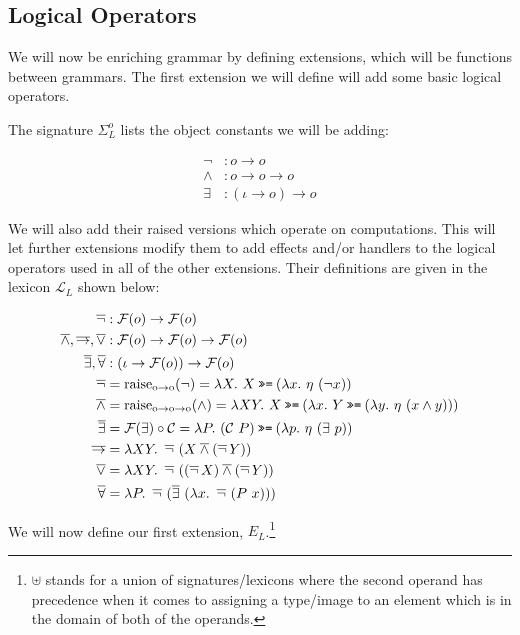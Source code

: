 \subsection{Logical Operators}

We will now be enriching grammar by defining extensions, which will be
functions between grammars. The first extension we will define will add
some basic logical operators.

The signature $\Sigma^o_L$ lists the object constants we will be
adding:

\begin{align*}
  \lnot &: o \to o \\
  \land &: o \to o \to o \\
  \exists &: (\iota \to o) \to o
\end{align*}

We will also add their raised versions which operate on computations. This
will let further extensions modify them to add effects and/or handlers to
the logical operators used in all of the other extensions. Their
definitions are given in the lexicon $\mathcal{L}_L$ shown below:

\begin{align*}
  \dnot &: \mathcal{F}(o) \to \mathcal{F}(o) \\
  \dand, \dimpl, \dor &: \mathcal{F}(o) \to \mathcal{F}(o) \to \mathcal{F}(o) \\
  \dexists, \dforall &: (\iota \to \mathcal{F}(o)) \to \mathcal{F}(o) \\
  \dnot &= \mathrm{raise_{o \to o}}(\lnot) = \lambda X.\ X \hsbind (\lambda x.\ \eta\ (\lnot x)) \\
  \dand &= \mathrm{raise_{o \to o \to o}}(\land) = \lambda X Y.\ X \hsbind (\lambda x.\ Y \hsbind (\lambda y.\ \eta\ (x \land y))) \\
  \dexists &= \mathcal{F}(\exists) \circ \mathcal{C} = \lambda P.\ (\mathcal{C}\ P) \hsbind (\lambda p.\ \eta\ (\exists\ p)) \\
  \dimpl &= \lambda X Y.\ \dnot\ (X \dand (\dnot Y)) \\
  \dor &= \lambda X Y.\ \dnot\ ((\dnot X) \dand (\dnot Y)) \\
  \dforall &= \lambda P.\ \dnot\ (\dexists\ (\lambda x.\ \dnot\ (P\ x)))
\end{align*}

We will now define our first extension, $E_L$.\footnote{$\uplus$ stands for
  a union of signatures/lexicons where the second operand has precedence
  when it comes to assigning a type/image to an element which is in the
  domain of both of the operands.}

